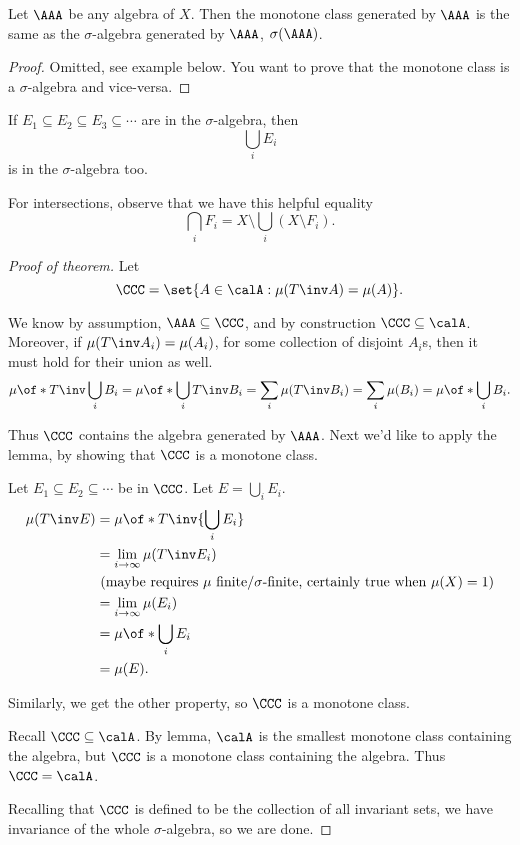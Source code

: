 \documentclass{article}
\theoremstyle{remark}
\begin{document}
\begin{lemma}
    Let $\AAA$ be any algebra of $X$. Then the monotone class
    generated by $\AAA$ is the same as the $\sigma$-algebra
    generated by $\AAA$, $\sigma(\AAA)$.
\end{lemma}
\begin{proof} Omitted, see example below. You want to prove 
    that the monotone class is a $\sigma$-algebra and vice-versa.
\end{proof}

\begin{example}
    If $E_1\subseteq E_2 \subseteq E_3 \subseteq \cdots $
    are in the $\sigma$-algebra, then
    \[\bigcup_i E_i\]
    is in the $\sigma$-algebra too.

    For intersections, observe that we have 
    this helpful equality
    \[\bigcap_i F_i = X\setminus \bigcup_i (X\setminus F_i). \]
\end{example}

\begin{proof}[Proof of theorem]
    Let 
    \[\CCC = \set{A\in \calA : \mu(T\inv A) = \mu(A) }.\]

    We know by assumption, $\AAA \subseteq \CCC$, and 
    by construction $\CCC\subseteq \calA$.
    Moreover, if $\mu(T\inv A_i) = \mu(A_i)$, for some 
    collection of disjoint $A_i$s, then 
    it must hold for their union as well. 
    \[\mu\of*{T\inv \bigcup_i B_i}
    = \mu\of*{\bigcup_i T\inv B_i}
    = \sum_i \mu(T\inv B_i)
    = \sum_i \mu(B_i)
    = \mu\of*{\bigcup_i B_i}.
    \]

    Thus $\CCC$ contains the algebra generated by $\AAA$.
    Next we'd like to apply the lemma, by showing that $\CCC$
    is a monotone class.

    Let $E_1\subseteq E_2 \subseteq \cdots $ be in $\CCC$.
    Let $E = \bigcup_i E_i$.
    \begin{align*}
        \mu(T\inv E) &= \mu\of*{T\inv{\bigcup_i E_i}} \\
        &= \lim_{i\to \infty} \mu(T\inv E_i)\\
        &\text{ (maybe requires $\mu$ finite/$\sigma$-finite, certainly true when $\mu(X)=1$)} \\
        & = \lim_{i\to\infty} \mu(E_i) \\
        & = \mu\of*{\bigcup_i E_i} \\
        &= \mu(E).
    \end{align*}

    Similarly, we get the other property, so $\CCC$ is a
    monotone class.

    Recall $\CCC\subseteq \calA$. By lemma, $\calA$ is the smallest
    monotone class containing the algebra, but $\CCC$ is a 
    monotone class containing the algebra. Thus $\CCC = \calA$.

    Recalling that $\CCC$ is defined to be the collection 
    of all invariant sets, 
    we have invariance of the whole $\sigma$-algebra, so 
    we are done.
\end{proof}
\end{document}
